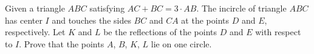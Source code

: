Given a triangle $ABC$ satisfying $AC+BC=3\cdot AB$. The incircle of triangle $ABC$ has center $I$ and touches the sides $BC$ and $CA$ at the points $D$ and $E$,  respectively. Let $K$ and $L$ be the reflections of the points $D$ and $E$ with respect to $I$. Prove that the points $A$,  $B$,  $K$,  $L$ lie on one circle.